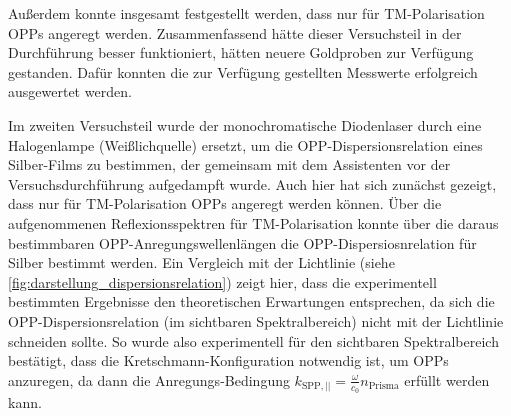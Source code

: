 Außerdem konnte insgesamt festgestellt werden, dass nur für TM-Polarisation OPPs angeregt werden.
Zusammenfassend hätte dieser Versuchsteil in der Durchführung besser funktioniert, hätten neuere Goldproben zur Verfügung gestanden. Dafür konnten
die zur Verfügung gestellten Messwerte erfolgreich ausgewertet werden.\par
Im zweiten Versuchsteil wurde der monochromatische Diodenlaser durch eine Halogenlampe (Weißlichquelle) ersetzt, um die OPP-Dispersionsrelation eines
Silber-Films zu bestimmen, der gemeinsam mit dem Assistenten vor der Versuchsdurchführung aufgedampft wurde. Auch hier hat sich zunächst gezeigt, dass
nur für TM-Polarisation OPPs angeregt werden können. Über die aufgenommenen Reflexionsspektren für TM-Polarisation konnte über die daraus bestimmbaren
OPP-Anregungswellenlängen die OPP-Dispersiosnrelation für Silber bestimmt werden. Ein Vergleich mit der Lichtlinie (siehe \cref{fig:darstellung_dispersionsrelation})
zeigt hier, dass die experimentell bestimmten Ergebnisse den theoretischen Erwartungen entsprechen, da sich die OPP-Dispersionsrelation (im sichtbaren Spektralbereich)
nicht mit der Lichtlinie schneiden sollte. So wurde also experimentell für den sichtbaren Spektralbereich bestätigt, dass die Kretschmann-Konfiguration
notwendig ist, um OPPs anzuregen, da dann die Anregungs-Bedingung $k_{\mathrm{SPP,||}} = \frac{\omega}{c_0} n_{\mathrm{Prisma}}$ erfüllt werden kann.